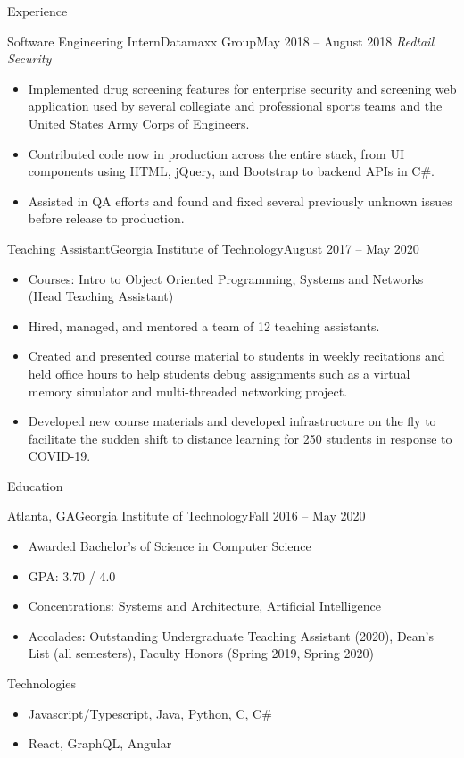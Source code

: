 \documentclass[]{mcdowellcv}
\begin{document}
\begin{cvsection}{Experience}
				\begin{cvsubsection}{Software Engineering Intern}{Datamaxx Group}{May 2018 -- August 2018}		
		\emph{Redtail Security}
			\begin{itemize}
				\item Implemented drug screening features for enterprise security and screening web application used by several collegiate and professional sports teams and the United States Army Corps of Engineers.
				\item Contributed code now in production across the entire stack, from UI components using HTML, jQuery, and Bootstrap to backend APIs in C\#.
				\item Assisted in QA efforts and found and fixed several previously unknown issues before release to production.
			\end{itemize}
		\end{cvsubsection}
		
		\begin{cvsubsection}{Teaching Assistant}{Georgia Institute of Technology}{August 2017 -- May 2020}
			\begin{itemize}
				\item Courses: Intro to Object Oriented Programming, Systems and Networks (Head Teaching Assistant)
				\item Hired, managed, and mentored a team of 12 teaching assistants.
				\item Created and presented course material to students in weekly recitations and held office hours to help students debug assignments such as a virtual memory simulator and multi-threaded networking project.
				\item Developed new course materials and developed infrastructure on the fly to facilitate the sudden shift to distance learning for 250 students in response to COVID-19.
			\end{itemize}
		\end{cvsubsection}
	\end{cvsection}
	
		\begin{cvsection}{Education}
		\begin{cvsubsection}{Atlanta, GA}{Georgia Institute of Technology}{Fall 2016 -- May 2020}
			\begin{itemize}
				\item Awarded Bachelor's of Science in Computer Science
				\item GPA: 3.70 / 4.0
				\item Concentrations: Systems and Architecture, Artificial Intelligence
				\item Accolades: Outstanding Undergraduate Teaching Assistant (2020), Dean's List (all semesters), Faculty Honors (Spring 2019, Spring 2020)
			\end{itemize}
		\end{cvsubsection}
	\end{cvsection}
	
	\begin{cvsection}{Technologies}
		\begin{cvsubsection}{}{}{}	
			\begin{itemize}
				\item Javascript/Typescript, Java, Python, C, C\#
				\item React, GraphQL, Angular
			\end{itemize}
		\end{cvsubsection}
	\end{cvsection}
	
\end{document}
